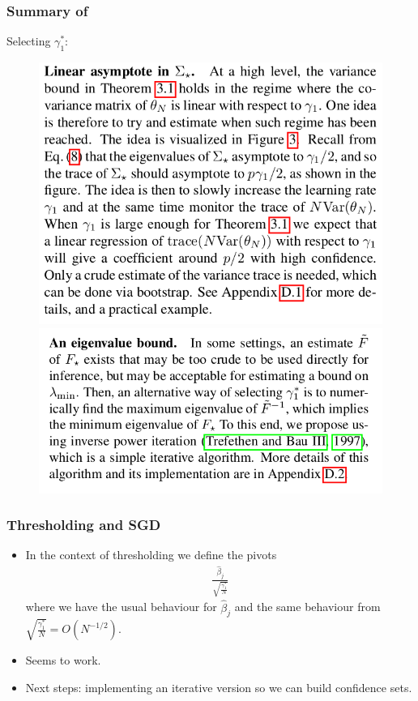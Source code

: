 \documentclass{beamer}
\begin{document}
\begin{frame}
  \frametitle{Summary of~\citet{chee:2023}}
  Selecting $\gamma_1^*$:
  \begin{figure}[h!]
    \centering
    \includegraphics[scale=0.25]{s1.png}
    \includegraphics[scale=0.25]{s2.png}
  \end{figure}
\end{frame}


\begin{frame}
  \frametitle{Thresholding and SGD}
  \begin{itemize}
  \item In the context of thresholding we define the pivots
    \begin{align*}
      \frac{\hat{\beta}_j}{\sqrt{\frac{\gamma_1^*}{N}}}
    \end{align*}
    where we have the usual behaviour for $\hat{\beta}_j$ and the same behaviour from $\sqrt{\frac{\gamma_1^*}{N}} = O(N^{-1/2})$.
  \item Seems to work.
  \item Next steps: implementing an iterative version so we can build confidence sets. 
  \end{itemize}
\end{frame}
\end{document}
